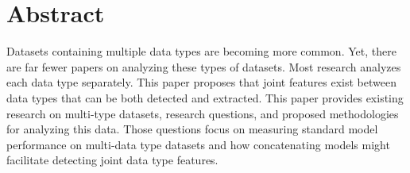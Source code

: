 \section{Abstract}

Datasets containing multiple data types are becoming more common.  Yet, there are far fewer papers on analyzing these types of datasets.  Most research analyzes each data type separately.  This paper proposes that joint features exist between data types that can be both detected and extracted.  This paper provides existing research on multi-type datasets, research questions, and proposed methodologies for analyzing this data.  Those questions focus on measuring standard model performance on multi-data type datasets and how concatenating models might facilitate detecting joint data type features.

